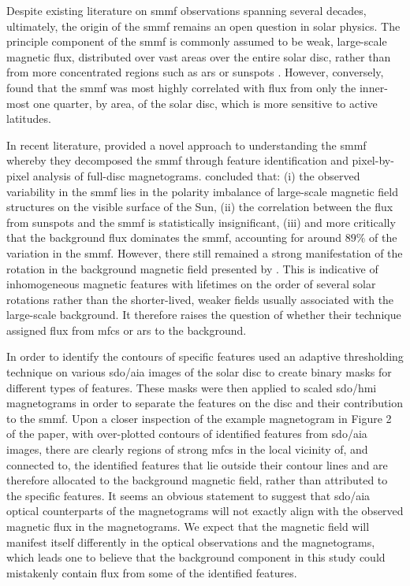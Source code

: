 Despite existing literature on \gls{smmf} observations spanning several decades, ultimately, the origin of the \gls{smmf} remains an open question in solar physics. The principle component of the \gls{smmf} is commonly assumed to be weak, large-scale magnetic flux, distributed over vast areas over the entire solar disc, rather than from more concentrated regions such as \glspl{ar} or sunspots \citep{severny_time_1971, scherrer_mean_1977, xiang_ensemble_2016}. However, conversely, \citet{scherrer_mean_1972} found that the \gls{smmf} was most highly correlated with flux from only the inner-most one quarter, by area, of the solar disc, which is more sensitive to active latitudes.

In recent literature, \citet{bose_variability_2018} provided a novel approach to understanding the \gls{smmf} whereby they decomposed the \gls{smmf} through feature identification and pixel-by-pixel analysis of full-disc magnetograms. \citet{bose_variability_2018} concluded that: (i) the observed variability in the \gls{smmf} lies in the polarity imbalance of large-scale magnetic field structures on the visible surface of the Sun, (ii) the correlation between the flux from sunspots and the \gls{smmf} is statistically insignificant, (iii) and more critically that the background flux dominates the \gls{smmf}, accounting for around $89 \%$ of the variation in the \gls{smmf}. However, there still remained a strong manifestation of the rotation in the background magnetic field presented by \citet{bose_variability_2018}. This is indicative of inhomogeneous magnetic features with lifetimes on the order of several solar rotations rather than the shorter-lived, weaker fields usually associated with the large-scale background. It therefore raises the question of whether their technique assigned flux from \glspl{mfc} or \glspl{ar} to the background.

In order to identify the contours of specific features \citet{bose_variability_2018} used an adaptive thresholding technique on various \gls{sdo/aia} images of the solar disc to create binary masks for different types of features. These masks were then applied to scaled \gls{sdo/hmi} magnetograms in order to separate the features on the disc and their contribution to the \gls{smmf}. Upon a closer inspection of the example magnetogram in Figure 2 of the paper, with over-plotted contours of identified features from \gls{sdo/aia} images, there are clearly regions of strong \glspl{mfc} in the local vicinity of, and connected to, the identified features that lie outside their contour lines and are therefore allocated to the background magnetic field, rather than attributed to the specific features. It seems an obvious statement to suggest that \gls{sdo/aia} optical counterparts of the magnetograms will not exactly align with the observed magnetic flux in the magnetograms. We expect that the magnetic field will manifest itself differently in the optical observations and the magnetograms, which leads one to believe that the background component in this study could mistakenly contain flux from some of the identified features.


